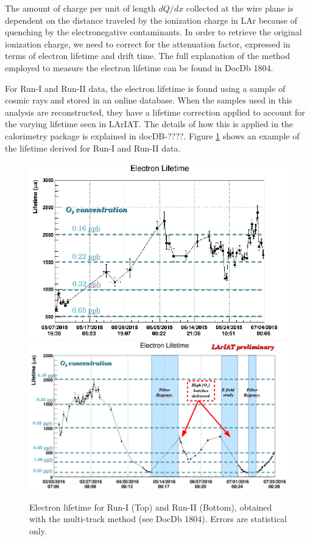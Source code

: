 The amount of charge per unit of length $dQ/dx$ collected at the wire plane is dependent on the distance traveled by the ionization charge in LAr because of quenching by the electronegative contaminants. In order to retrieve the original ionization charge, we need to correct for the attenuation factor, expressed in terms of electron lifetime and drift time. The full explanation of the method employed to measure the electron lifetime can be found in DocDb 1804.

For Run-I and Run-II data, the electron lifetime is found using a sample of cosmic rays and stored in an online database. When the samples used in this analysis are reconstructed, they have a lifetime correction applied to account for the varying lifetime seen in LArIAT. The details of how this is applied in the calorimetry package is explained in docDB-????. Figure \ref{fig:LifetimeNOchargecorrection} shows an example of the lifetime derived for Run-I and Run-II data.

\begin{figure}[h!]
\centering
\includegraphics[scale=0.35]{./images/Run1Lifetime.png}
\includegraphics[scale=0.28]{./images/Run2Lifetime.png}
\caption{Electron lifetime for Run-I (Top) and Run-II (Bottom), obtained with the multi-track method (see DocDb 1804). Errors are statistical only.}
\label{fig:LifetimeNOchargecorrection}
\end{figure}

